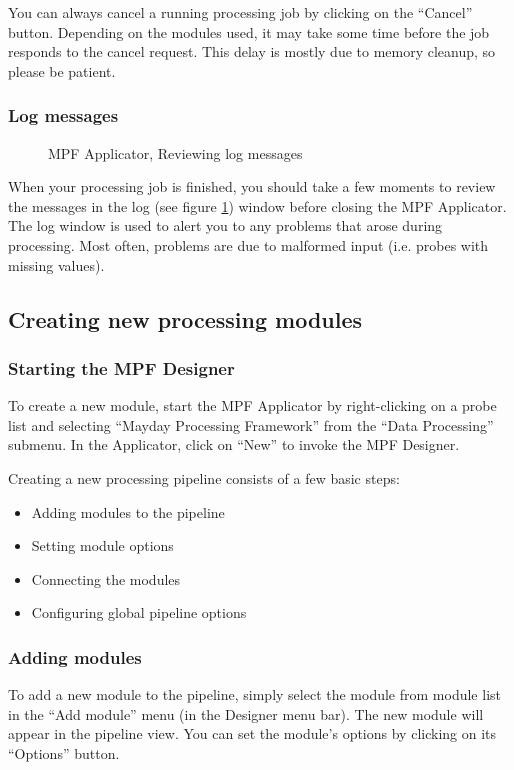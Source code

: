 \documentclass[11pt,fleqn,a4paper]{article}
\newcommand{\Figure}[4][optional,]{
  \begin{figure}[#1]
    \begin{center}
      \resizebox*{!}{#4\height}{\texttt{[image: \#2]}}
      \caption{#3 \label{#2}}
    \end{center}
  \end{figure}
}
\begin{document}
You can always cancel a running processing job by clicking on the ``Cancel'' button. Depending on the modules used, it may take some time before the job responds to the cancel request. This delay is mostly due to memory cleanup, so please be patient.

\subsubsection*{Log messages}

\Figure[!ht]{step4.eps}{ MPF Applicator, Reviewing log messages}{0.5}

When your processing job is finished, you should take a few moments to review the messages in the log (see figure \ref{step4.eps}) window before closing the MPF Applicator. The log window is used to alert you to any problems that arose during processing. Most often, problems are due to malformed input (i.e. probes with missing values).

\subsection*{Creating new processing modules}

\subsubsection*{Starting the MPF Designer}
To create a new module, start the MPF Applicator by right-clicking on a probe list and selecting ``Mayday Processing Framework'' from the ``Data Processing'' submenu. In the Applicator, click on ``New'' to invoke the MPF Designer.

Creating a new processing pipeline consists of a few basic steps:

\begin{itemize}
\item Adding modules to the pipeline
\item Setting module options
\item Connecting the modules
\item Configuring global pipeline options
\end{itemize}

\subsubsection*{Adding modules}

To add a new module to the pipeline, simply select the module from module list in the ``Add module'' menu (in the Designer menu bar). The new module will appear in the pipeline view. You can set the module's options by clicking on its ``Options'' button.
\end{document}
